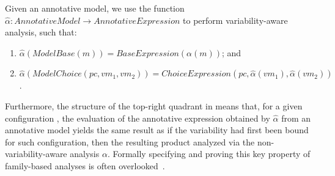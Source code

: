 
\begin{definition}
\label{defn:hat-alpha}
Given an annotative model, we use the function $\mathit{\hat{\alpha}:AnnotativeModel \to AnnotativeExpression}$ to perform variability-aware analysis, such that:
\begin{enumerate}
    \item $\mathit{\hat\alpha(ModelBase(m)) = BaseExpression(\alpha(m))}$; and
    \item $\mathit{\hat\alpha(ModelChoice(pc,vm_1,vm_2)) = ChoiceExpression(pc,\hat\alpha(vm_1),\hat\alpha(vm_2))}$.
\end{enumerate} 
\end{definition}

Furthermore, the structure of the top-right quadrant in   means that, for a given configuration , the evaluation of the annotative expression obtained by $\hat{\alpha}$ from an annotative model  yields the same result as if the variability had first been bound for such configuration, then the resulting product analyzed via the non-variability-aware analysis $\alpha$. 
Formally specifying and proving this key property of family-based analyses is often overlooked~\cite{Thum2014}. 

